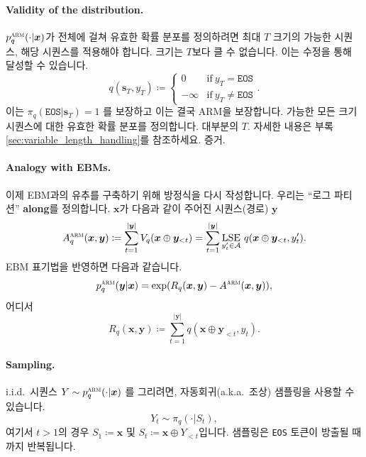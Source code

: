 \documentclass{article}
\def\s{{\bm{s}}}
\def\x{{\bm{x}}}
\def\y{{\bm{y}}}
\def\cA{{\mathcal{A}}}
\newcommand{\Qsub}[1]{R_{#1}}
\def\arm{{\textsc{arm}}}
\def\lse{{\mathrm{LSE}}}
\def\eos{\texttt{EOS}\xspace}
\def\augvoc{\cA}
\def\iid{{i.i.d.\ }}
\def\aka{{a.k.a.\ }}
\begin{document}
\paragraph{Validity of the distribution.}

$p^\arm_q(\cdot|\x)$가 전체에 걸쳐 유효한 확률 분포를 정의하려면
최대 $T$ 크기의 가능한 시퀀스, 해당 시퀀스를 적용해야 합니다.
크기는 $T$보다 클 수 없습니다. 
이는 수정을 통해 달성할 수 있습니다. 
 \begin{equation} 
q( \s _T, y_T) \coloneqq 
 \begin{cases} 
0 & \mbox{if} ~ y_T = \eos \\
- \infty & \mbox{if} ~ y_T \neq \eos 
 \end{cases} .
 \label{eq:q_last_token} 
 \end{equation} 
이는 $\pi_q(\eos|\s_T) = 1$ 를 보장하고 이는 결국 ARM을 보장합니다.
가능한 모든 크기 시퀀스에 대한 유효한 확률 분포를 정의합니다.
대부분의 $T$.  자세한 내용은 부록 \ref{sec:variable_length_handling}를 참조하세요.
증거.

\paragraph{Analogy with EBMs.}

이제 EBM과의 유추를 구축하기 위해 방정식을 다시 작성합니다.
우리는 ``로그 파티션'' \textbf{along}를 정의합니다.
$\x$가 다음과 같이 주어진 시퀀스(경로) $\y$
 \begin{equation} 
A^ \arm _q( \x , \y ) 
 \coloneqq \sum _{t=1}^{| \y |} V_q( \x \oplus \y _{<t})
= \sum _{t=1}^{| \y |} \underset{y'_t \in \augvoc} { \lse } ~ q( \x \oplus \y _{<t}, y'_t).
 \end{equation} 
EBM 표기법을 반영하면 다음과 같습니다.
 \begin{equation} 
p^ \arm _q( \y | \x ) = \exp ( \Qsub{q} ( \x , \y ) - A^ \arm ( \x , \y )),
 \end{equation} 
어디서
 \begin{equation} 
 \Qsub{q} ( \x , \y ) \coloneqq \sum _{t=1}^{| \y |} q( \x \oplus \y _{<t}, y_t).
 \end{equation}

\paragraph{Sampling.}

\iid 시퀀스 $Y \sim p^\arm_q(\cdot|\x)$ 를 그리려면, 
자동회귀(\aka 조상) 샘플링을 사용할 수 있습니다.
 \begin{equation} 
Y_t \sim \pi _q( \cdot | S_t),
 \end{equation} 
여기서 $t > 1$의 경우 $S_1 \coloneqq \x$ 및 $S_t \coloneqq \x \oplus Y_{<t}$입니다.
샘플링은 \eos 토큰이 방출될 때까지 반복됩니다. 
\end{document}
